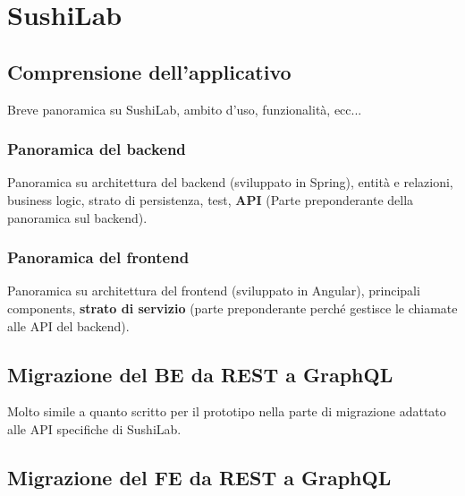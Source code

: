 
\section{SushiLab}
\label{sushi-lab}
\subsection{Comprensione dell'applicativo}
Breve panoramica su SushiLab, ambito d'uso, funzionalità, ecc...
\subsubsection{Panoramica del backend}
Panoramica su architettura del backend (sviluppato in Spring), entità e relazioni, business logic, strato di persistenza, test, \textbf{API} (Parte preponderante della panoramica sul backend).
\subsubsection{Panoramica del frontend}
Panoramica su architettura del frontend (sviluppato in Angular), principali components, \textbf{strato di servizio} (parte preponderante perché gestisce le chiamate alle API del backend).
\subsection{Migrazione del BE da REST a GraphQL}
Molto simile a quanto scritto per il prototipo nella parte di migrazione adattato alle API specifiche di SushiLab.
\subsection{Migrazione del FE da REST a GraphQL}


